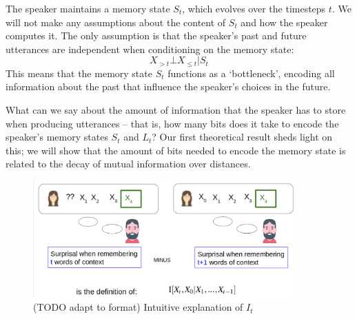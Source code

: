 \documentclass[11pt,letterpaper]{article}
\begin{document}
The speaker maintains a memory state $S_t$, which evolves over the timesteps $t$.
We will not make any assumptions about the content of $S_t$ and how the speaker computes it.
The only assumption is that the speaker's past and future utterances are independent when conditioning on the memory state:
\begin{equation}\label{eq:markov-speaker}
X_{>t} \bot X_{\leq t} | S_t
\end{equation}
This means that the memory state $S_t$ functions as a `bottleneck', encoding all information about the past that influence the speaker's choices in the future.

What can we say about the amount of information that the speaker has to store when producing utterances -- that is, how many bits does it take to encode the speaker's  memory states $S_t$ and $L_t$?
Our first theoretical result sheds light on this; we will show that the amount of bits needed to encode the memory state is related to the decay of mutual information over distances.




\begin{figure}
\includegraphics[width=0.9\textwidth]{figures/listener-it.png}
	\caption{(TODO adapt to format) Intuitive explanation of $I_t$}
\end{figure}
\end{document}
